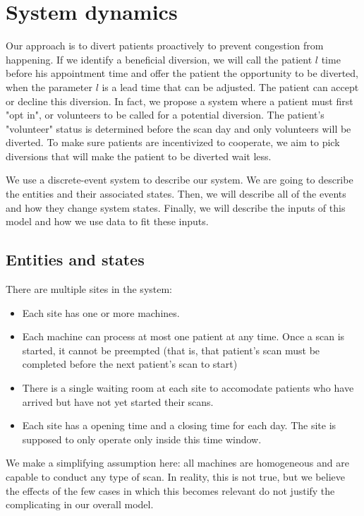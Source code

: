 \section{System dynamics}

Our approach is to divert patients proactively to prevent
congestion from happening. If we identify
a beneficial diversion, we will call the patient $l$ time
before his appointment time and offer the patient
the opportunity to be diverted, when the parameter $l$
is a lead time that can be adjusted. The patient can accept or
decline this diversion. In fact, we propose a system where
a patient must first "opt in", or volunteers to be called
for a potential diversion. The patient's "volunteer" status
is determined before the scan day and only volunteers
will be diverted. To make sure patients
are incentivized to cooperate, we aim to pick diversions
that will make the patient to be diverted wait less.

We use a discrete-event system to describe our system. We are going
to describe the entities and their associated states. Then, we
will describe all of the events and how they change system states.
Finally, we will describe the inputs of this model and how
we use data to fit these inputs.

\subsection{Entities and states}

There are multiple sites in the system:
\begin{itemize}
\item Each site has one or more machines.
\item Each machine can process at most one patient at any time.
  Once a scan is started, it cannot be preempted (that is, that
  patient's scan must be completed before the next patient's
  scan to start)
\item There is a single waiting room at each site to accomodate
      patients who have arrived but have not yet started their scans.
\item Each site has a opening time and a closing time for each day.
      The site is supposed to only operate only inside this time window.
\end{itemize}
We make a simplifying assumption here: all machines are homogeneous
and are capable to conduct any type of scan. In reality, this is not
true, but we believe the effects of the few cases in which this becomes
relevant do not justify the complicating in our overall model.

